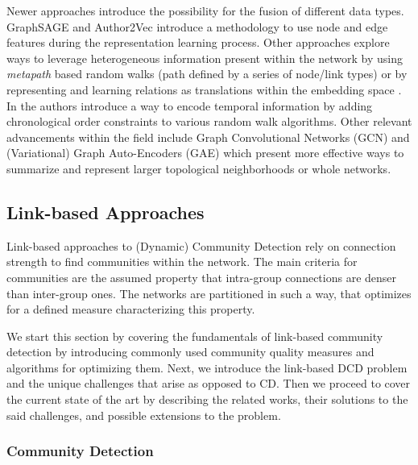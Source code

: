 \documentclass[
acmsmall,
nonacm,
screen,
acmthm]{acmart}
\begin{document}
Newer approaches introduce the possibility for the fusion of different
data types. GraphSAGE
\citep{hamiltonInductiveRepresentationLearning2018} and Author2Vec
\citep{wuAuthor2VecFrameworkGenerating2020} introduce a methodology to
use node and edge features during the representation learning process.
Other approaches explore ways to leverage heterogeneous information
present within the network by using \emph{metapath} based random walks
(path defined by a series of node/link types)
\citep{dongMetapath2vecScalableRepresentation2017} or by representing
and learning relations as translations within the embedding space
\citep{bordesTranslatingEmbeddingsModeling2013}. In
\citet{nguyenContinuousTimeDynamicNetwork2018} the authors introduce a
way to encode temporal information by adding chronological order
constraints to various random walk algorithms. Other relevant
advancements within the field include Graph Convolutional Networks (GCN)
\citep{kipfSemiSupervisedClassificationGraph2017a} and (Variational)
Graph Auto-Encoders (GAE) \citep{kipfVariationalGraphAutoEncoders2016}
which present more effective ways to summarize and represent larger
topological neighborhoods or whole networks.

\hypertarget{link-based-approaches}{%
\subsection{Link-based Approaches}\label{link-based-approaches}}

Link-based approaches to (Dynamic) Community Detection rely on
connection strength to find communities within the network. The main
criteria for communities are the assumed property that intra-group
connections are denser than inter-group ones. The networks are
partitioned in such a way, that optimizes for a defined measure
characterizing this property.

We start this section by covering the fundamentals of link-based
community detection by introducing commonly used community quality
measures and algorithms for optimizing them. Next, we introduce the
link-based DCD problem and the unique challenges that arise as opposed
to CD. Then we proceed to cover the current state of the art by
describing the related works, their solutions to the said challenges,
and possible extensions to the problem.

\hypertarget{community-detection-1}{%
\subsubsection{Community Detection}\label{community-detection-1}}
\end{document}

